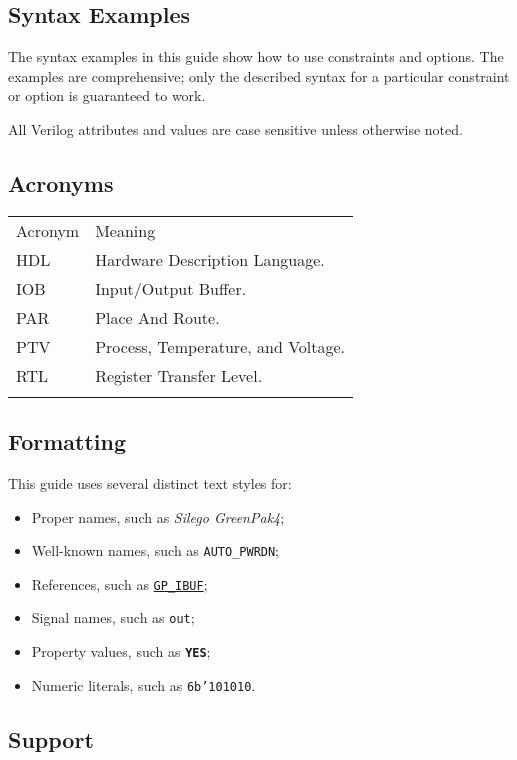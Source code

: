 \documentclass[11pt]{article}
\newcommand{\namestyle}[1]{\textit{#1}}
\newcommand{\tokenstyle}[1]{\texttt{#1}}
\newcommand{\wirestyle}[1]{\texttt{#1}}
\newcommand{\valuestyle}[1]{\texttt{#1}}
\newcommand{\strvaluestyle}[1]{\valuestyle{\textquotedbl#1\textquotedbl}}
\newcommand{\datastyle}[1]{\texttt{#1}}
\newcommand{\whenstyle}[1]{{\fontseries{sb}\selectfont#1}}
\newcommand{\tokenref}[2]{\hyperref[#2]{\tokenstyle{#1}}}
\newcommand{\thinhline}{\Xhline{1\arrayrulewidth}}
\newcommand{\thickhline}{\Xhline{2.5\arrayrulewidth}}
\begin{document}
\subsection{Syntax Examples}
The syntax examples in this guide show how to use constraints and options. The examples are comprehensive; only the
described syntax for a particular constraint or option is guaranteed to work.

All Verilog attributes and values are case sensitive unless otherwise noted.

\subsection{Acronyms}

\begin{tabularx}{10cm}{lX}
\thinhline
\whenstyle{Acronym} & \whenstyle{Meaning} \\
\thickhline
HDL & Hardware Description Language. \\
\thinhline
IOB & Input/Output Buffer. \\
\thinhline
PAR & Place And Route. \\
\thinhline
PTV & Process, Temperature, and Voltage. \\
\thinhline
RTL & Register Transfer Level. \\
\thinhline
\end{tabularx}

\subsection{Formatting}
This guide uses several distinct text styles for:
\begin{itemize}
	\item Proper names, such as \namestyle{Silego GreenPak4};
	\item Well-known names, such as \tokenstyle{AUTO\_PWRDN};
	\item References, such as \tokenref{GP\_IBUF}{gp-ibuf};
	\item Signal names, such as \wirestyle{out};
	\item Property values, such as \strvaluestyle{\textbf{YES}};
	\item Numeric literals, such as \datastyle{6b'101010}.
\end{itemize}

\subsection{Support}
\end{document}
